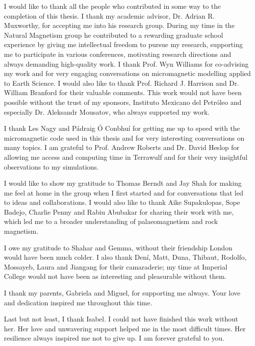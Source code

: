 \let\cleardoublepage\clearpage
{}
{}

\begin{acknowledgements}
I would like to thank all the people who contributed in some way to the completion of this thesis. I thank my academic advisor, Dr. Adrian R. Muxworthy, for accepting me into his research group. During my time in the Natural Magnetism group he contributed to a rewarding graduate school experience by giving me intellectual freedom to pursue my research, supporting me to participate in various conferences, motivating research directions and always demanding high-quality work. I thank Prof. Wyn Williams for co-advising my work and for very engaging conversations on micromagnetic modelling applied to Earth Science. I would also like to thank Prof. Richard J. Harrison and Dr. William Branford for their valuable comments. This work would not have been possible without the trust of my sponsors, Instituto Mexicano del Petr\'oleo and especially Dr. Aleksandr Mousatov, who always supported my work.\par

I thank Les Nagy and P\'adraig \'O Conbhu\'i for getting me up to speed with the micromagnetic code used in this thesis and for very interesting conversations on many topics. I am grateful to Prof. Andrew Roberts and Dr. David Heslop for allowing me access and computing time in Terrawulf and for their very insightful observations to my simulations.\par

I would like to show my gratitude to Thomas Berndt and Jay Shah for making me feel at home in the group when I first started and for conversations that led to ideas and collaborations. I would also like to thank Aike Supakulopas, Sope Badejo, Charlie Penny and Rabiu Abubakar for sharing their work with me, which led me to a broader understanding of palaeomagnetism and rock magnetism.\par

I owe my gratitude to Shahar and Gemma, without their friendship London would have been much colder. I also thank Den\'i, Matt, Duna, Thibaut, Rodolfo, Mossayeb, Laura and Jiangang for their camaraderie; my time at Imperial College would not have been as interesting and pleasurable without them.\par

I thank my parents, Gabriela and Miguel, for supporting me always. Your love and dedication inspired me throughout this time.\par

Last but not least, I thank Isabel. I could not have finished this work without her. Her love and unwavering support helped me in the most difficult times. Her resilience always inspired me not to give up. I am forever grateful to you.\par
\end{acknowledgements}
